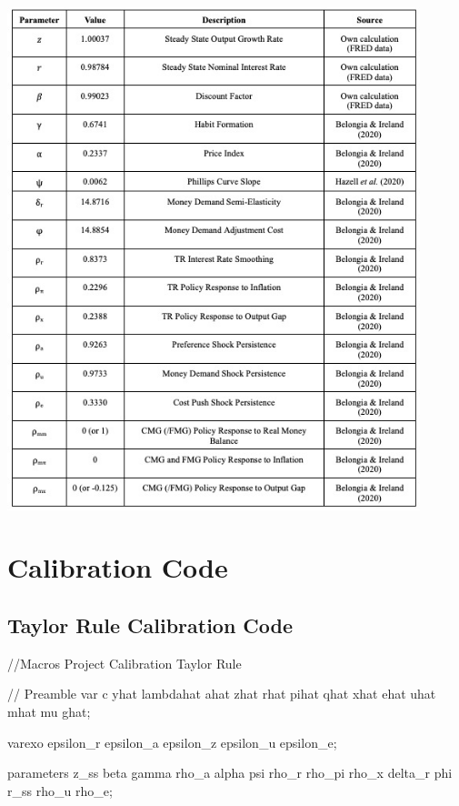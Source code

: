 \documentclass[11pt,preprint, authoryear]{elsarticle}
\let\origfigure\figure
\let\endorigfigure\endfigure
\renewenvironment{figure}[1][2] {
    \expandafter\origfigure\expandafter[H]
} {
    \endorigfigure
}
\numberwithin{equation}{section}
\numberwithin{figure}{section}
\numberwithin{table}{section}
\begin{document}
\begin{figure}
\centering
\includegraphics[width=0.9\textwidth,height=0.7\textheight]{./figures/table-param.jpeg}
\caption{Parameter Values}
\end{figure}

\newpage

\hypertarget{calibration-code}{%
\section{Calibration Code}\label{calibration-code}}

\hypertarget{taylor-rule-calibration-code}{%
\subsection{Taylor Rule Calibration
Code}\label{taylor-rule-calibration-code}}

//Macros Project Calibration Taylor Rule

// Preamble var c yhat lambdahat ahat zhat rhat pihat qhat xhat ehat
uhat mhat mu ghat;

varexo epsilon\_r epsilon\_a epsilon\_z epsilon\_u epsilon\_e;

parameters z\_ss beta gamma rho\_a alpha psi rho\_r rho\_pi rho\_x
delta\_r phi r\_ss rho\_u rho\_e;
\end{document}
